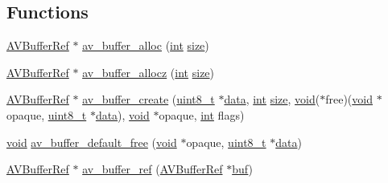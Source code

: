 \subsection*{Functions}
\begin{DoxyCompactItemize}
\item 
\hyperlink{struct_a_v_buffer_ref}{A\+V\+Buffer\+Ref} $\ast$ \hyperlink{group__lavu__buffer_ga5ae84ac902283dea1a660ede06c1cdac}{av\+\_\+buffer\+\_\+alloc} (\hyperlink{xmltok_8h_a5a0d4a5641ce434f1d23533f2b2e6653}{int} \hyperlink{group__lavu__mem_ga854352f53b148adc24983a58a1866d66}{size})
\item 
\hyperlink{struct_a_v_buffer_ref}{A\+V\+Buffer\+Ref} $\ast$ \hyperlink{group__lavu__buffer_ga27f37cc004f768b00442b6cb08091686}{av\+\_\+buffer\+\_\+allocz} (\hyperlink{xmltok_8h_a5a0d4a5641ce434f1d23533f2b2e6653}{int} \hyperlink{group__lavu__mem_ga854352f53b148adc24983a58a1866d66}{size})
\item 
\hyperlink{struct_a_v_buffer_ref}{A\+V\+Buffer\+Ref} $\ast$ \hyperlink{group__lavu__buffer_ga3e7f4c92db85ccba0b2a16dd0069842a}{av\+\_\+buffer\+\_\+create} (\hyperlink{lib-src_2ffmpeg_2win32_2stdint_8h_a9a941819355e6f658991890ff66b4b0e}{uint8\+\_\+t} $\ast$\hyperlink{lib_2expat_8h_ac39e72a1de1cb50dbdc54b08d0432a24}{data}, \hyperlink{xmltok_8h_a5a0d4a5641ce434f1d23533f2b2e6653}{int} \hyperlink{group__lavu__mem_ga854352f53b148adc24983a58a1866d66}{size}, \hyperlink{sound_8c_ae35f5844602719cf66324f4de2a658b3}{void}($\ast$free)(\hyperlink{sound_8c_ae35f5844602719cf66324f4de2a658b3}{void} $\ast$opaque, \hyperlink{lib-src_2ffmpeg_2win32_2stdint_8h_a9a941819355e6f658991890ff66b4b0e}{uint8\+\_\+t} $\ast$\hyperlink{lib_2expat_8h_ac39e72a1de1cb50dbdc54b08d0432a24}{data}), \hyperlink{sound_8c_ae35f5844602719cf66324f4de2a658b3}{void} $\ast$opaque, \hyperlink{xmltok_8h_a5a0d4a5641ce434f1d23533f2b2e6653}{int} flags)
\item 
\hyperlink{sound_8c_ae35f5844602719cf66324f4de2a658b3}{void} \hyperlink{group__lavu__buffer_ga37d620e8cfc9f2f3261c2b4c5d4adfe0}{av\+\_\+buffer\+\_\+default\+\_\+free} (\hyperlink{sound_8c_ae35f5844602719cf66324f4de2a658b3}{void} $\ast$opaque, \hyperlink{lib-src_2ffmpeg_2win32_2stdint_8h_a9a941819355e6f658991890ff66b4b0e}{uint8\+\_\+t} $\ast$\hyperlink{lib_2expat_8h_ac39e72a1de1cb50dbdc54b08d0432a24}{data})
\item 
\hyperlink{struct_a_v_buffer_ref}{A\+V\+Buffer\+Ref} $\ast$ \hyperlink{group__lavu__buffer_gaa40ce7d3ede946a89d03323bbd7268c1}{av\+\_\+buffer\+\_\+ref} (\hyperlink{struct_a_v_buffer_ref}{A\+V\+Buffer\+Ref} $\ast$\hyperlink{xlstr_8c_a781718f5b53a876fe91c424c4607fa8f}{buf})

\end{DoxyCompactItemize}
